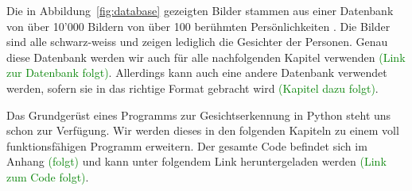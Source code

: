 Die in Abbildung~\ref{fig:database} gezeigten Bilder stammen aus einer Datenbank von über 10'000 Bildern von über 100 berühmten Persönlichkeiten \cite{Chen14}.
Die Bilder sind alle schwarz-weiss und zeigen lediglich die Gesichter der Personen.
Genau diese Datenbank werden wir auch für alle nachfolgenden Kapitel verwenden \textcolor{green}{(Link zur Datenbank folgt)}.
Allerdings kann auch eine andere Datenbank verwendet werden, sofern sie in das richtige Format gebracht wird \textcolor{green}{(Kapitel dazu folgt)}.

Das Grundgerüst eines Programms zur Gesichtserkennung in Python steht uns schon zur Verfügung.
Wir werden dieses in den folgenden Kapiteln zu einem voll funktionsfähigen Programm erweitern.
Der gesamte Code befindet sich im Anhang \textcolor{green}{(folgt)} und kann unter folgendem Link heruntergeladen werden \textcolor{green}{(Link zum Code folgt)}.